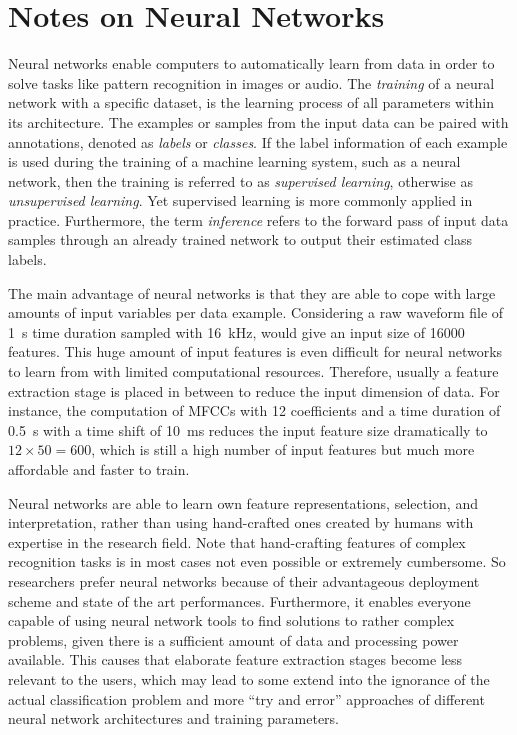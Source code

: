 
\section{Notes on Neural Networks}\label{sec:intro_nn}
Neural networks enable computers to automatically learn from data in order to solve tasks like pattern recognition in images or audio.
The \emph{training} of a neural network with a specific dataset, is the learning process of all parameters within its architecture.
The examples or samples from the input data can be paired with annotations, denoted as \emph{labels} or \emph{classes}.
If the label information of each example is used during the training of a machine learning system, such as a neural network, then the training is referred to as \emph{supervised learning}, otherwise as \emph{unsupervised learning}.
Yet supervised learning is more commonly applied in practice.
Furthermore, the term \emph{inference} refers to the forward pass of input data samples through an already trained network to output their estimated class labels.

The main advantage of neural networks is that they are able to cope with large amounts of input variables per data example.
Considering a raw waveform file of \SI{1}{s} time duration sampled with \SI{16}{\kilo\hertz}, would give an input size of 16000 features.
This huge amount of input features is even difficult for neural networks to learn from with limited computational resources.
Therefore, usually a feature extraction stage is placed in between to reduce the input dimension of data.
For instance, the computation of MFCCs with 12 coefficients and a time duration of \SI{0.5}{s} with a time shift of \SI{10}{\milli\second} reduces the input feature size dramatically to $12 \times 50 = 600$, which is still a high number of input features but much more affordable and faster to train.

Neural networks are able to learn own feature representations, selection, and interpretation, rather than using hand-crafted ones created by humans with expertise in the research field.
Note that hand-crafting features of complex recognition tasks is in most cases not even possible or extremely cumbersome.
So researchers prefer neural networks because of their advantageous deployment scheme and state of the art performances.
Furthermore, it enables everyone capable of using neural network tools to find solutions to rather complex problems, given there is a sufficient amount of data and processing power available.
This causes that elaborate feature extraction stages become less relevant to the users, which may lead to some extend into the ignorance of the actual classification problem and more \enquote{try and error} approaches of different neural network architectures and training parameters.

